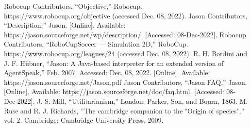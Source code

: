 \documentclass[conference]{IEEEtran}
\begin{document}
\begin{thebibliography}{00}
 Robocup Contributors, ``Objective,''
Robocup. https://www.robocup.org/objective (accessed Dec. 08, 2022).
 Jason Contributors, ``Description,''
Jason. [Online]. Available:
https://jason.sourceforge.net/wp/description/. [Accessed: 08-Dec-2022].
 Robocup Contributors, ``RoboCupSoccer ---
Simulation 2D,'' RoboCup. https://www.robocup.org/leagues/24 (accessed Dec. 08,
2022).
 R. H. Bordini and J. F. Hübner, ``Jason: A Java-based
interpreter for an extended version of AgentSpeak,'' Feb. 2007. Accessed:
Dec. 08, 2022. [Online]. Available: https://jason.sourceforge.net/Jason.pdf
 Jason Contributors, ``Jason FAQ,''
Jason. [Online]. Available:
https://jason.sourceforge.net/doc/faq.html. [Accessed: 08-Dec-2022].
 J. S. Mill, ``Utilitarianism,'' London: Parker, Son, and Bourn, 1863.
 M. Ruse and R. J. Richards, ''The cambridge companion to the "Origin of species",'' vol. 2. Cambridge: Cambridge University Press, 2009.
\end{thebibliography}
\end{document}
